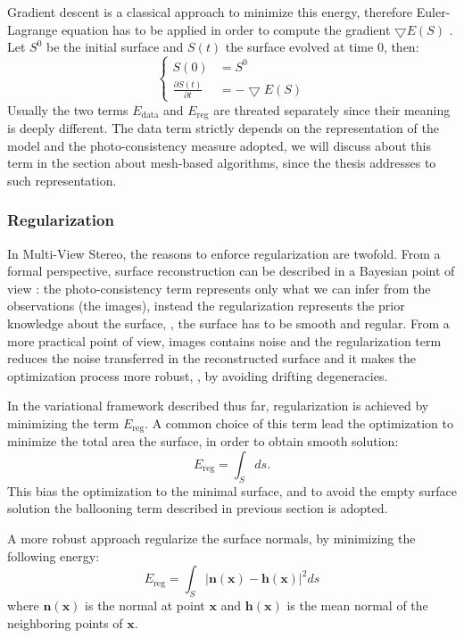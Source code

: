 Gradient descent is a classical approach to minimize this energy, therefore Euler-Lagrange equation has to be applied in order to compute the gradient $\bigtriangledown E(\mathit{S})$ \cite{hermosillo2002variational}. Let $\mathit{S}^0$ be the initial surface and $\mathit{S}(t)$ the surface evolved at time $0$, then:
\begin{equation}
 \begin{cases}
  \mathit{S}(0) &=\mathit{S}^0\\
  \frac{\partial \mathit{S}(t)}{\partial t} & = -\bigtriangledown E(\mathit{S})
 \end{cases}
\end{equation}
Usually the two terms $E_{\text{data}}$ and $E_{\text{reg}}$ are threated separately since their meaning is deeply different.
The data term strictly depends on the representation of the model and the photo-consistency measure adopted, we will discuss about this term in the section about mesh-based algorithms, since the thesis addresses to such representation.

\subsubsection{Regularization}
In Multi-View Stereo, the reasons to enforce regularization are twofold. From a formal perspective, surface reconstruction can be described in a Bayesian point of view \cite[11]{delaunoy2011modelisation}: the photo-consistency term represents only what we can infer from the observations (the images), instead the regularization represents the prior knowledge about the surface, \ie, the surface has to be smooth and regular. 
From a more practical point of view, images contains noise and the regularization term reduces the noise transferred in the reconstructed surface and it makes the optimization process more robust, \eg, by avoiding drifting degeneracies.

In the variational framework described thus far, regularization is achieved by minimizing the term $E_{\text{reg}}$. 
A common choice of this term lead the optimization to minimize the total area the surface, in order to obtain smooth solution:
\[
E_{\text{reg}} = \int_{\mathit{S}} ds.
\]
This bias the optimization to the minimal surface, and to avoid the empty surface solution the ballooning term described in previous section is adopted.

A more robust approach regularize the surface normals, by minimizing the following energy:
\[
E_{\text{reg}} = \int_{\mathit{S}} |\mathbf{n}(\mathbf{x}) - \mathbf{h}(\mathbf{x})|^2 ds
\]
where $\mathbf{n}(\mathbf{x})$ is the normal at point $\mathbf{x}$ and $\mathbf{h}(\mathbf{x})$ is the mean normal of the neighboring points of $\mathbf{x}$.

